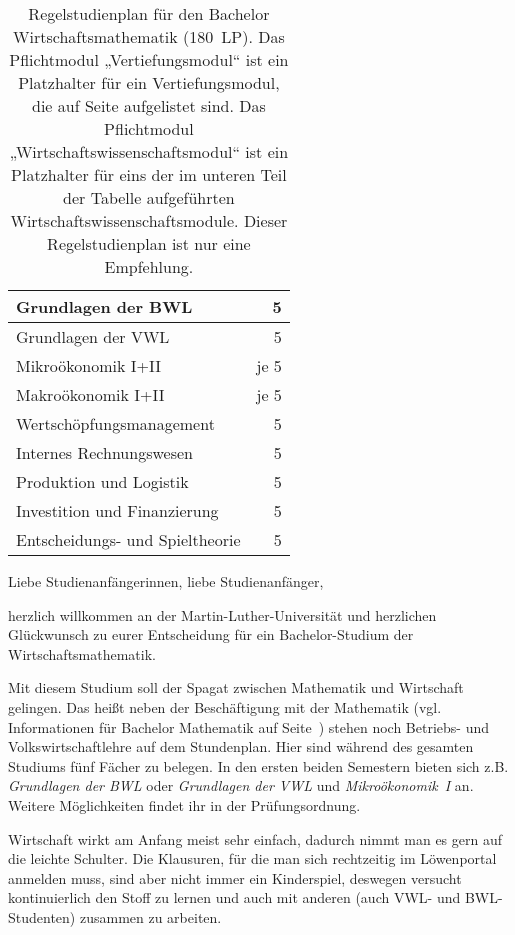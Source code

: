 \begin{table}[tbp]
\begin{small}
\begin{tabularx}{\textwidth}{|X||c|c|c|c|c|c||r|}
			\multicolumn{7}{|X||}{Grundlagen der BWL}&5\\\hline
			\multicolumn{7}{|X||}{Grundlagen der VWL}&5\\\hline
			\multicolumn{7}{|X||}{Mikroökonomik I+II}&je 5\\\hline
			\multicolumn{7}{|X||}{Makroökonomik I+II}&je 5\\\hline
			\multicolumn{7}{|X||}{Wertschöpfungsmanagement}&5\\\hline
			\multicolumn{7}{|X||}{Internes Rechnungswesen}&5\\\hline
			\multicolumn{7}{|X||}{Produktion und Logistik}&5\\\hline
			\multicolumn{7}{|X||}{Investition und Finanzierung}&5\\\hline
			\multicolumn{7}{|X||}{Entscheidungs- und Spieltheorie}&5\\\hline
		\end{tabularx}
	\end{small}
	\caption{\label{plan-wima}Regelstudienplan für den Bachelor Wirtschaftsmathematik (180~LP). Das Pflichtmodul „Vertiefungsmodul“ ist ein Platzhalter für ein Vertiefungsmodul, die auf Seite \pageref{studiengang_mathematik} aufgelistet sind. Das Pflichtmodul „Wirtschaftswissenschaftsmodul“ ist ein Platzhalter für eins der im unteren Teil der Tabelle aufgeführten Wirtschaftswissenschaftsmodule. Dieser Regelstudienplan ist nur eine Empfehlung.}
\end{table}

Liebe Studienanfängerinnen, liebe Studienanfänger,\par

herzlich willkommen an der Martin-Luther-Universität und herzlichen Glückwunsch zu eurer Entscheidung für ein Bachelor-Studium der Wirtschaftsmathematik.

Mit diesem Studium soll der Spagat zwischen Mathematik und Wirtschaft gelingen.
Das heißt neben der Beschäftigung mit der Mathematik (vgl. Informationen für Bachelor Mathematik auf Seite~\pageref{studiengang_mathematik}) stehen noch Betriebs- und Volkswirtschaftlehre auf dem Stundenplan.
Hier sind während des gesamten Studiums fünf Fächer zu belegen.
In den ersten beiden Semestern bieten sich z.B. \textit{Grundlagen der BWL} oder \textit{Grundlagen der VWL} und \textit{Mikroökonomik~I} an.
Weitere Möglichkeiten findet ihr in der Prüfungsordnung.

Wirtschaft wirkt am Anfang meist sehr einfach, dadurch nimmt man es gern auf die leichte Schulter.
Die Klausuren, für die man sich rechtzeitig im Löwenportal anmelden muss, sind aber nicht immer ein Kinderspiel, deswegen versucht kontinuierlich den Stoff zu lernen und auch mit anderen (auch VWL- und BWL-Studenten) zusammen zu arbeiten.

